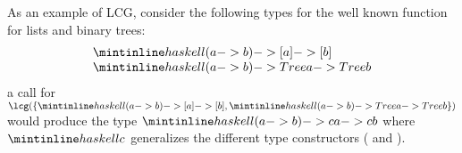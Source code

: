 As an example of LCG, consider the following types for
the well known  function for lists and binary trees:
\[
  \begin{array}{l}
       \haskell{(a -> b) -> [a] -> [b]}\\
       \haskell{(a -> b) -> Tree a -> Tree b}
  \end{array}
\]
a call for $\lcg(\{\haskell{(a -> b) -> [a] -> [b]},\haskell{(a -> b)
  -> Tree a -> Tree b}\})$ would produce the type $\haskell{(a -> b)
  -> c a -> c b}$ where $\haskell{c}$ generalizes the different type
constructors (\haskell{[]} and ). 